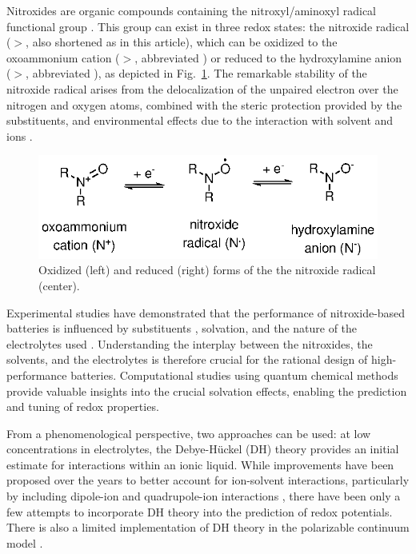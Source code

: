 \documentclass[review,preprint]{elsarticle}
\begin{document}
Nitroxides are organic compounds containing the nitroxyl/aminoxyl radical functional group \cite{berlinerHistoryUseNitroxides2012}. This group can exist in three redox states: the nitroxide radical ($>$, also shortened as  in this article), which can be oxidized to the oxoammonium cation ($>$, abbreviated ) or reduced to the hydroxylamine anion ($>$, abbreviated ), as depicted in Fig.~\ref{fig:states}. The remarkable stability of the nitroxide radical arises from the delocalization of the unpaired electron over the nitrogen and oxygen atoms, combined with the steric protection provided by the substituents, and environmental effects due to the interaction with solvent and ions \cite{grynovaOriginScopeLongRange2013,grynovaSwitchingRadicalStability2013}. 

\begin{figure}[!h]
	\centering
	\includegraphics[width=.7\linewidth]{Figure1}
	\caption{Oxidized (left) and reduced (right) forms of the the nitroxide radical (center).}
	\label{fig:states}
\end{figure}

Experimental studies have demonstrated that the performance of nitroxide-based batteries is influenced by substituents \cite{sugaCathodeAnodeActivePoly2007}, solvation, and the nature of the electrolytes used \cite{armandIonicliquidMaterialsElectrochemical2009,strehmelRadicalsIonicLiquids2012,wylieIncreasedStabilityNitroxide2019b}. Understanding the interplay between the nitroxides, the solvents, and the electrolytes is therefore crucial for the rational design of high-performance batteries. Computational studies using quantum chemical methods provide valuable insights into the crucial solvation effects, enabling the prediction and tuning of redox properties.

From a phenomenological perspective, two approaches can be used: at low concentrations in electrolytes, the Debye-Hückel (DH) theory \cite{kontogeorgisDebyeHuckelTheoryIts2018,silvaDerivationsDebyeHuckel2022,silvaImprovingBornEquation2024} provides an initial estimate for interactions within an ionic liquid. While improvements have been proposed over the years to better account for ion-solvent interactions, particularly by including dipole-ion \cite{silvaImprovingBornEquation2024} and quadrupole-ion interactions \cite{slavchovQuadrupoleTermsMaxwell2014,slavchovQuadrupoleTermsMaxwell2014a,coxQuadrupolemediatedDielectricResponse2021}, there have been only a few attempts \cite{matsuiDensityFunctionalTheory2013,xiaoReorganizationEnergyElectron2013,xiaoMolecularDebyeHuckelApproach2014} to incorporate DH theory into the prediction of redox potentials. There is also a limited implementation of DH theory in the polarizable continuum model \cite{cossiInitioStudyIonic1998}. 
\end{document}
